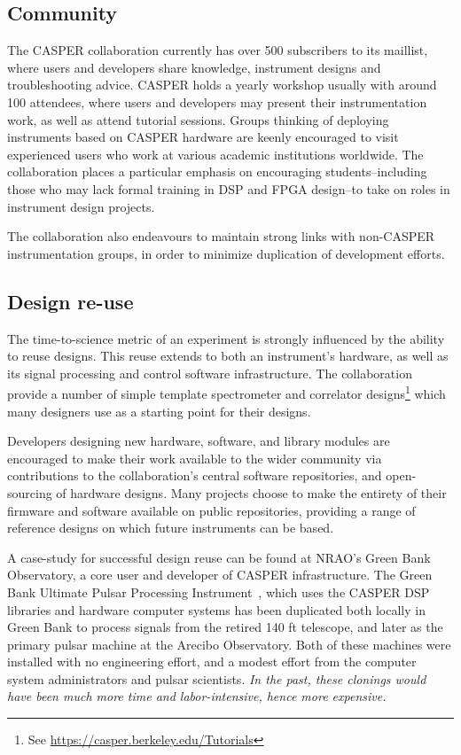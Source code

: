 \documentclass{ws-jai}
\begin{document}
\subsection{Community}
The CASPER collaboration currently has over 500 subscribers to its maillist, where users and developers share knowledge, instrument designs and troubleshooting advice. CASPER holds a yearly workshop usually with around 100 attendees, where users and developers may present their instrumentation work, as well as attend tutorial sessions. Groups thinking of deploying instruments based on CASPER hardware are keenly encouraged to visit experienced users who work at various academic institutions worldwide.
The collaboration places a particular emphasis on encouraging students--including those who may lack formal training in DSP and FPGA design--to take on roles in instrument design projects.

The collaboration also endeavours to maintain strong links with non-CASPER instrumentation groups, in order to minimize duplication of development efforts. 

\subsection{Design re-use}
The time-to-science metric of an experiment is strongly influenced by the ability to
reuse designs. This reuse extends to both an instrument's hardware, as well as its signal processing and control software infrastructure.
The collaboration provide a number of simple template spectrometer and correlator designs\footnote{See \url{https://casper.berkeley.edu/Tutorials}} which many designers use as a starting point for their designs.

Developers designing new hardware, software, and library modules are encouraged to make their work available to the wider community via contributions to the collaboration's central software repositories, and open-sourcing of hardware designs. Many projects choose to make the entirety of their firmware and software available on public repositories, providing a range of reference designs on which future instruments can be based. 

A case-study for successful design reuse can be found at NRAO's Green Bank Observatory, a core user and developer of CASPER infrastructure.
The Green Bank Ultimate Pulsar Processing
Instrument~\citep{guppi}, which uses the CASPER DSP libraries and hardware
computer systems has been duplicated both locally in Green Bank to process signals
from the retired 140 ft telescope, and later as
the primary pulsar machine at the Arecibo Observatory.  Both of these
machines were installed with no engineering effort, and a modest
effort from the computer system administrators and pulsar scientists.
\emph{In the past, these clonings would have been much more time and
  labor-intensive, hence more expensive.}
\end{document}
